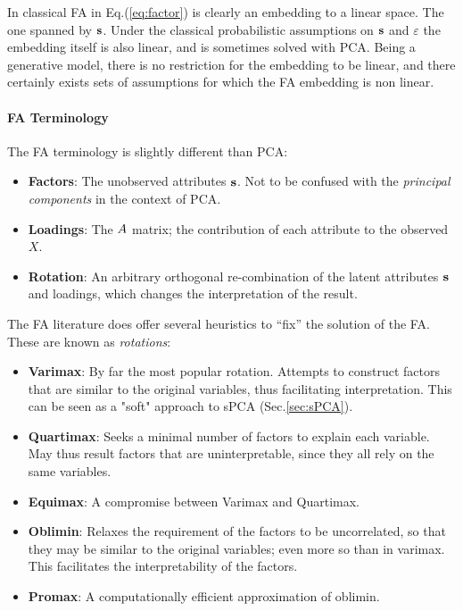 \documentclass[12pt,a4paper]{article}
\begin{document}
\begin{remark}
	In classical FA in Eq.(\ref{eq:factor}) is clearly an embedding to a linear space. 
	The one spanned by $\mathbf{s}$. 
	Under the classical probabilistic assumptions on $\mathbf{s}$ and $\varepsilon$ the embedding itself is also linear, and is sometimes solved with PCA. 
	Being a generative model, there is no restriction for the embedding to be linear, and there certainly exists sets of assumptions for which the FA embedding is non linear. 
\end{remark}

\paragraph{FA Terminology}
The FA terminology is slightly different than PCA:
\begin{itemize}
	\item \textbf{Factors}: The unobserved attributes $\mathbf{s}$. 
	Not to be confused with the \emph{principal components} in the context of PCA.
	\item \textbf{Loadings}: 
	The $A$ matrix; the contribution of each attribute to the observed $X$.
	\item \textbf{Rotation}: An arbitrary orthogonal re-combination of the latent attributes $\mathbf{s}$ and loadings, which changes the interpretation of the result.
\end{itemize}


The FA literature does offer several heuristics to ``fix'' the solution of the FA. 
These are known as \emph{rotations}:
\begin{itemize}
	\item \textbf{Varimax}: 
	By far the most popular rotation. Attempts to construct factors that are similar to the original variables, thus facilitating interpretation. 
	This can be seen as a "soft" approach to sPCA (Sec.\ref{sec:sPCA}).
	
	\item \textbf{Quartimax}: 
	Seeks a minimal number of factors to explain each variable. 
	May thus result factors that are uninterpretable, since they all rely on the same variables.
	
	\item \textbf{Equimax}: A compromise between Varimax and Quartimax. 
	
	\item \textbf{Oblimin}: 
	Relaxes the requirement of the factors to be uncorrelated, so that they may be similar to the original variables; even more so than in varimax. 
	This facilitates the interpretability of the factors. 
	
	\item \textbf{Promax}: 
	A computationally efficient approximation of oblimin.
\end{itemize}
\end{document}
